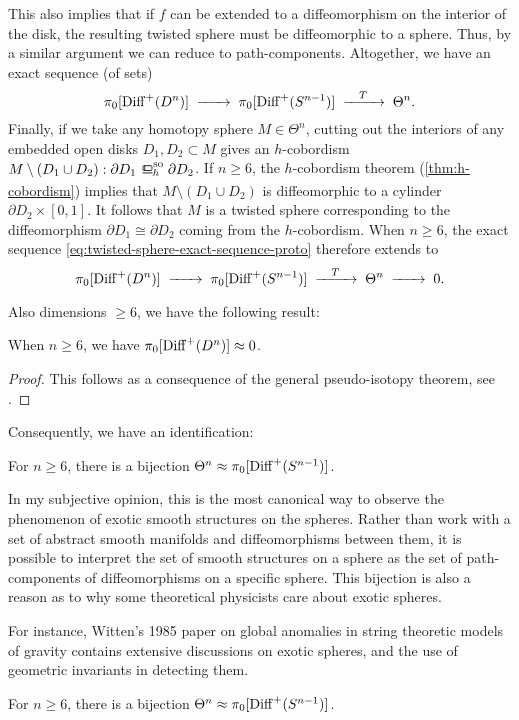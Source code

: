 	This also implies that if $f$ can be extended to a diffeomorphism on the interior of the disk, the resulting twisted sphere must be diffeomorphic to a sphere. Thus, by a similar argument we can reduce to path-components. Altogether, we have an exact sequence (of sets)
	\begin{equation}\label{eq:twisted-sphere-exact-sequence-proto}
		\pi_0 [\Diff^+(D^n)] \lkxto \pi_0 [\Diff^+(S^{n-1})] \lkxto[T] \Theta^n.
	\end{equation}
	Finally, if we take any homotopy sphere $M\in \Theta^n$, cutting out the interiors of any embedded open disks $D_1, D_2\subset M$ gives an $h$-cobordism $M\setminus(D_1\cup D_2) : \partial D_1 \sohbord \partial D_2$. If $n\geq 6$, the $h$-cobordism theorem (\ref{thm:h-cobordism}) implies that $M \setminus (D_1\cup D_2)$ is diffeomorphic to a cylinder $\partial D_2\times [0,1]$. It follows that $M$ is a twisted sphere corresponding to the diffeomorphism $\partial D_1 \cong \partial D_2$ coming from the $h$-cobordism.
	When $n\geq 6$, the exact sequence \cref{eq:twisted-sphere-exact-sequence-proto} therefore extends to 
	\[
		\pi_0 [\Diff^+(D^n)] \lkxto \pi_0 [\Diff^+(S^{n-1})] \lkxto[T] \Theta^n \lkxto 0.
	\]

	Also dimensions $\geq 6$, we have the following result:
	\begin{theorem}[Cerf]
		When $n\geq 6$, we have $\pi_0[\operatorname{Diff}^+(D^n)]\approx 0$.
	\end{theorem}
	\begin{proof}
		This follows as a consequence of the general pseudo-isotopy theorem, see \cite{cerf1970pseudoisotopy}.
	\end{proof}

	Consequently, we have an identification:

	\begin{corollary}
		For $n\geq 6$, there is a bijection $\Theta^n \approx \pi_0[\operatorname{Diff}^+(S^{n-1})]$.
	\end{corollary}

	In my subjective opinion, this is the most canonical way to observe the phenomenon of exotic smooth structures on the spheres. Rather than work with a set of abstract smooth manifolds and diffeomorphisms between them, it is possible to interpret the set of smooth structures on a sphere as the set of path-components of diffeomorphisms on a specific sphere. This bijection is also a reason as to why some theoretical physicists care about exotic spheres.

	For instance, Witten's 1985 paper \cite{witten1985anomalies} on global anomalies in string theoretic models of gravity contains extensive discussions on exotic spheres, and the use of geometric invariants in detecting them.

\begin{theorem}
  For $n\geq 6$, there is a bijection $\Theta^n \approx \pi_0[\operatorname{Diff}^+(S^{n-1})]$.
\end{theorem}
